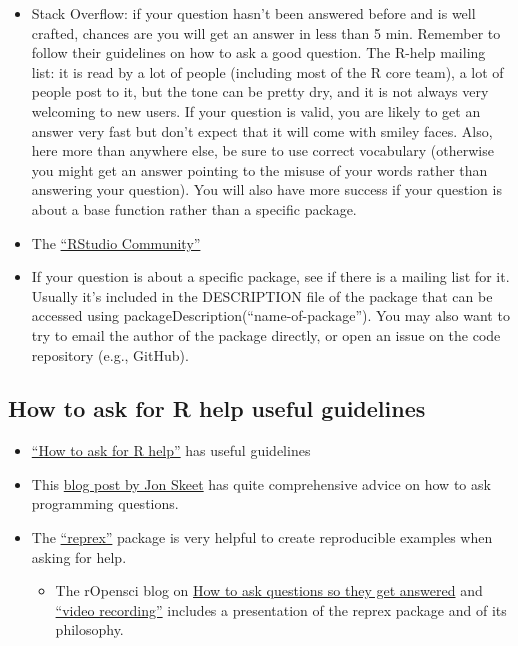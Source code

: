 \documentclass[
]{book}
\providecommand{\tightlist}{%
  \setlength{\itemsep}{0pt}\setlength{\parskip}{0pt}}
\begin{document}
\begin{itemize}
\tightlist
\item
  Stack Overflow: if your question hasn't been answered before and is well crafted, chances are you will get an answer in less than 5 min. Remember to follow their guidelines on how to ask a good question.
  The R-help mailing list: it is read by a lot of people (including most of the R core team), a lot of people post to it, but the tone can be pretty dry, and it is not always very welcoming to new users. If your question is valid, you are likely to get an answer very fast but don't expect that it will come with smiley faces. Also, here more than anywhere else, be sure to use correct vocabulary (otherwise you might get an answer pointing to the misuse of your words rather than answering your question). You will also have more success if your question is about a base function rather than a specific package.
\item
  The \href{https://community.rstudio.com/}{``RStudio Community''}
\item
  If your question is about a specific package, see if there is a mailing list for it. Usually it's included in the DESCRIPTION file of the package that can be accessed using packageDescription(``name-of-package''). You may also want to try to email the author of the package directly, or open an issue on the code repository (e.g., GitHub).
\end{itemize}

\hypertarget{how-to-ask-for-r-help-useful-guidelines}{%
\subsection*{How to ask for R help useful guidelines}\label{how-to-ask-for-r-help-useful-guidelines}}

\begin{itemize}
\tightlist
\item
  \href{https://blog.revolutionanalytics.com/2014/01/how-to-ask-for-r-help.html}{``How to ask for R help''} has useful guidelines
\item
  This \href{https://codeblog.jonskeet.uk/2010/08/29/writing-the-perfect-question/}{blog post by Jon Skeet} has quite comprehensive advice on how to ask programming questions.
\item
  The \href{https://cran.rstudio.com/web/packages/reprex/}{``reprex''} package is very helpful to create reproducible examples when asking for help.

  \begin{itemize}
  \tightlist
  \item
    The rOpensci blog on \href{https://ropensci.org/commcalls/2017-03-07/}{How to ask questions so they get answered} and \href{https://vimeo.com/208749032}{``video recording''} includes a presentation of the reprex package and of its philosophy.
  \end{itemize}
\end{itemize}
\end{document}
